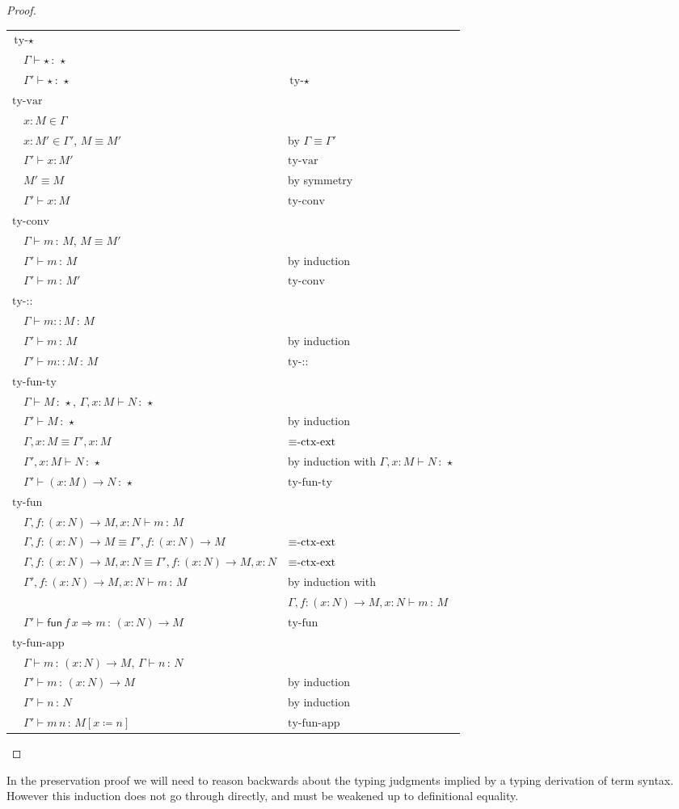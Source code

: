 \begin{proof}
\begin{tabular}{lll}
\multicolumn{3}{l}{$\textrm{ty-}\star$}\tabularnewline
 & $\Gamma\vdash\star\,:\,\star$ & \tabularnewline
 & $\Gamma'\vdash\star\,:\,\star$ & $\textrm{ty-}\star$\tabularnewline
\multicolumn{3}{l}{$\textrm{ty-var}$}\tabularnewline
 & $x:M\in\Gamma$ & \tabularnewline
 & $x:M'\in\Gamma'$, $M\equiv M'$ & by $\Gamma\equiv\Gamma'$\tabularnewline
 & $\Gamma'\vdash x:M'$ & $\textrm{ty-var}$\tabularnewline
 & $M'\equiv M$ & by symmetry\tabularnewline
 & $\Gamma'\vdash x:M$ & $\textrm{ty-conv}$\tabularnewline
\multicolumn{3}{l}{$\textrm{ty-conv}$}\tabularnewline
 & $\Gamma\vdash m\,:\,M$, $M\equiv M'$ & \tabularnewline
 & $\Gamma'\vdash m\,:\,M$ & by induction\tabularnewline
 & $\Gamma'\vdash m\,:\,M'$ & $\textrm{ty-conv}$\tabularnewline
\multicolumn{3}{l}{$\textrm{ty-::}$}\tabularnewline
 & $\Gamma\vdash m::M\,:\,M$ & \tabularnewline
 & $\Gamma'\vdash m\,:\,M$ & by induction\tabularnewline
 & $\Gamma'\vdash m::M\,:\,M$ & $\textrm{ty-::}$\tabularnewline
\multicolumn{3}{l}{$\textrm{ty-fun-ty}$}\tabularnewline
 & $\Gamma\vdash M\,:\,\star$, $\Gamma,x:M\vdash N\,:\,\star$ & \tabularnewline
 & $\Gamma'\vdash M\,:\,\star$ & by induction\tabularnewline
 & $\Gamma,x:M\equiv\Gamma',x:M$ & $\textrm{\ensuremath{\equiv}-ctx-ext}$\tabularnewline
 & $\Gamma',x:M\vdash N\,:\,\star$ & by induction with $\Gamma,x:M\vdash N\,:\,\star$\tabularnewline
 & $\Gamma'\vdash\left(x:M\right)\rightarrow N\,:\,\star$ & $\textrm{ty-fun-ty}$\tabularnewline
\multicolumn{3}{l}{$\textrm{ty-fun}$}\tabularnewline
 & $\Gamma,f:\left(x:N\right)\rightarrow M,x:N\vdash m\,:\,M$ & \tabularnewline
 & $\Gamma,f:\left(x:N\right)\rightarrow M\equiv\Gamma',f:\left(x:N\right)\rightarrow M$ & $\textrm{\ensuremath{\equiv}-ctx-ext}$\tabularnewline
 & $\Gamma,f:\left(x:N\right)\rightarrow M,x:N\equiv\Gamma',f:\left(x:N\right)\rightarrow M,x:N$ & $\textrm{\ensuremath{\equiv}-ctx-ext}$\tabularnewline
 & $\Gamma',f:\left(x:N\right)\rightarrow M,x:N\vdash m\,:\,M$ & by induction with\tabularnewline
 &  & $\Gamma,f:\left(x:N\right)\rightarrow M,x:N\vdash m\,:\,M$\tabularnewline
 & $\Gamma'\vdash\mathsf{fun}\,f\,x\Rightarrow m\,:\,\left(x:N\right)\rightarrow M$ & $\textrm{ty-fun}$\tabularnewline
\multicolumn{3}{l}{$\textrm{ty-fun-app}$}\tabularnewline
 & $\Gamma\vdash m\,:\,\left(x:N\right)\rightarrow M$, $\Gamma\vdash n\,:\,N$ & \tabularnewline
 & $\Gamma'\vdash m\,:\,\left(x:N\right)\rightarrow M$ & by induction\tabularnewline
 & $\Gamma'\vdash n\,:\,N$ & by induction\tabularnewline
 & $\Gamma'\vdash m\,n\,:\,M\left[x\coloneqq n\right]$ & $\textrm{ty-fun-app}$\tabularnewline
\end{tabular}
\end{proof}
In the preservation proof we will need to reason backwards about the
typing judgments implied by a typing derivation of term syntax. However
this induction does not go through directly, and must be weakened
up to definitional equality.

